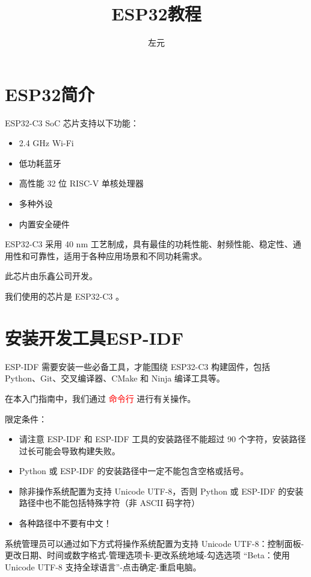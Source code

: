 \documentclass[lang=cn,newtx,10pt,scheme=chinese]{elegantbook}
\title{ESP32教程}
\author{左元}
\begin{document}
\maketitle
\frontmatter

\tableofcontents

\mainmatter

\chapter{ESP32简介}

ESP32-C3 SoC 芯片支持以下功能：

\begin{itemize}
  \item 2.4 GHz Wi-Fi
  \item 低功耗蓝牙
  \item 高性能 32 位 RISC-V 单核处理器
  \item 多种外设
  \item 内置安全硬件
\end{itemize}

ESP32-C3 采用 40 nm 工艺制成，具有最佳的功耗性能、射频性能、稳定性、通用性和可靠性，适用于各种应用场景和不同功耗需求。

此芯片由乐鑫公司开发。

\begin{marker}
  我们使用的芯片是 ESP32-C3 。
\end{marker}

\chapter{安装开发工具ESP-IDF}

ESP-IDF 需要安装一些必备工具，才能围绕 ESP32-C3 构建固件，包括 Python、Git、交叉编译器、CMake 和 Ninja 编译工具等。

在本入门指南中，我们通过 \textcolor{red}{命令行} 进行有关操作。

\begin{marker}
限定条件：

\begin{itemize}
\item 请注意 ESP-IDF 和 ESP-IDF 工具的安装路径不能超过 90 个字符，安装路径过长可能会导致构建失败。
\item Python 或 ESP-IDF 的安装路径中一定不能包含空格或括号。
\item 除非操作系统配置为支持 Unicode UTF-8，否则 Python 或 ESP-IDF 的安装路径中也不能包括特殊字符（非 ASCII 码字符）
\item 各种路径中不要有中文！
\end{itemize}

系统管理员可以通过如下方式将操作系统配置为支持 Unicode UTF-8：控制面板-更改日期、时间或数字格式-管理选项卡-更改系统地域-勾选选项 “Beta：使用 Unicode UTF-8 支持全球语言”-点击确定-重启电脑。
\end{marker}
\end{document}
